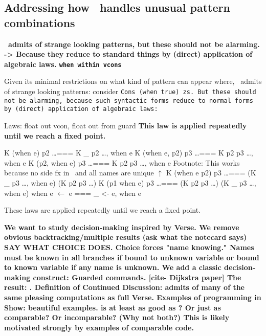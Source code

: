 \documentclass[manuscript,screen,review, 12pt]{acmart}
\begin{document}
\begin{outline}[enumerate]
    
\subsection{Addressing how \PPlus\ handles unusual pattern combinations}
\2 \bf{\PPlus\ admits of strange looking patterns, but these should not be alarming. }
\2 \bf{-> Because they reduce to standard things by (direct) application of algebraic laws. }
\3 \bf{\tt{when} within vcons }

    Given its minimal restrictions on what kind of pattern can appear where,
    \PPlus\ admits of strange looking patterns: consider \tt{Cons (when true)
    zs}. But these should not be alarming, because such syntactic forms reduce
    to normal forms by (direct) application of algebraic laws: 

    
        \3 Laws: float out vcon, float out from guard
        \3 \bf{This law is applied repeatedly until we reach a fixed point.}

        \3 K (when e) p2 \dots === K \_ p2 \dots, when e
        \3 K (when e, p2) p3 \dots  === K p2 p3 \dots, when e
        \3 K (p2, when e) p3 \dots  === K p2 p3 \dots, when e
        \3 Footnote: This works because no side fx in \PPlus\ and all names are unique $\uparrow$ 
        \3 K (when e \pbar p2) p3 \dots === (K \_ p3 \dots, when e) \pbar (K p2 p3 \dots)
        \3 K (p1 \pbar when e) p3 \dots === (K p2 p3 \dots) \pbar (K \_ p3 \dots, when e) 
        \3 when e $\leftarrow$ e === \_ <- e, when e

        
        These laws are applied repeatedly until we reach a fixed point. 
        
    \1 \bf{We want to study decision-making inspired by Verse. }
        \2 \bf{We remove obvious backtracking/multiple results (ask what the notecard says)}
        SAY WHAT CHOICE DOES. 
        \bf{Choice forces "name knowing." Names must be known in all branches 
        if bound to unknown variable or bound to known variable if any name 
        is unknown}.
        \2 \bf{We add a classic decision-making construct: Guarded commands. }
        [cite- Dijkstra paper]
        \2 \bf{The result: \VMinus. }
    \1 \bf{Definition of \VMinus}
    \1 \bf{Continued Discussion:}
    \2 \bf{{\VMinus} admits of many of the same pleasing computations as full Verse. }
    \2 \bf{Examples of programming in \VMinus }
    \3 \bf{Show: beautiful examples. }
    \2 \bf{{\VMinus} is at least as good as {\PPlus}? Or just as comparable? }
        Or incomparable? (Why not both?)
    \3 \bf{\bf{This is likely motivated strongly by examples of comparable code.}}
    \end{outline}
\end{document}
